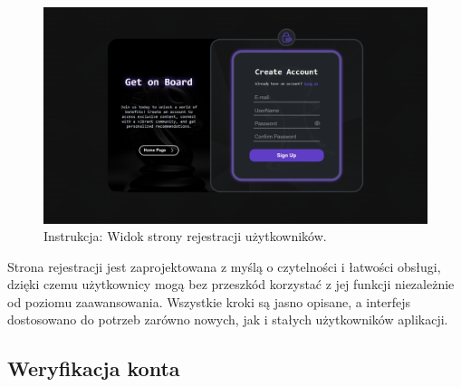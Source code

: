 \documentclass[12pt,a4paper]{article}
\begin{document}
\vspace{0.5cm}
\begin{figure}[h!]
    \centering
    \includegraphics[width=1\textwidth]{images/ins_reg.png}
    \caption{Instrukcja: Widok strony rejestracji użytkowników.}
\end{figure}
\vspace{0.5cm}

\noindent
Strona rejestracji jest zaprojektowana z myślą o czytelności i łatwości obsługi, dzięki czemu użytkownicy mogą bez przeszkód korzystać z jej funkcji niezależnie od poziomu zaawansowania. Wszystkie kroki są jasno opisane, a interfejs dostosowano do potrzeb zarówno nowych, jak i stałych użytkowników aplikacji.

\newpage

\subsection{Weryfikacja konta}
\end{document}
